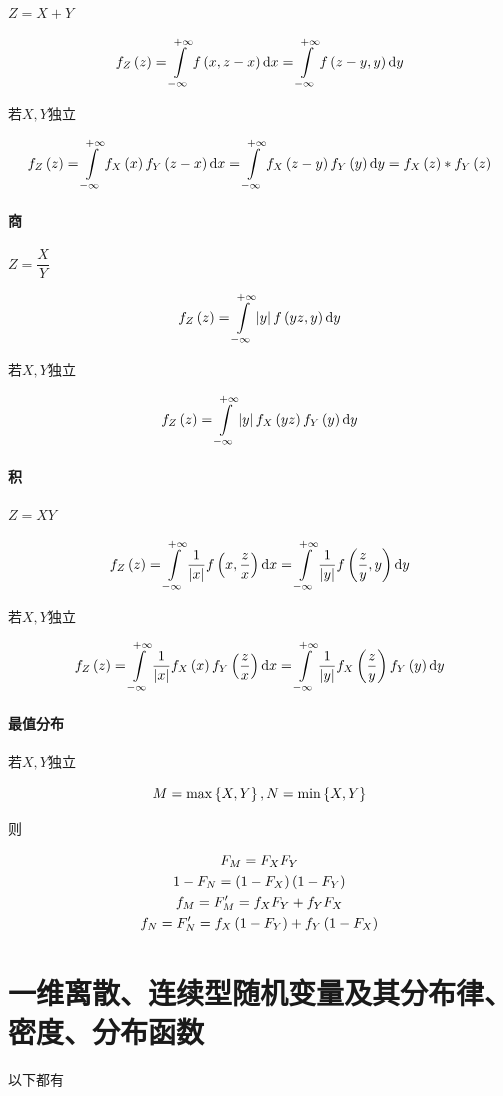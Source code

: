 \documentclass{article}
\begin{document}
$Z=X+Y$

\[f_Z\p{z}
    =\impint f\p{x,z-x}\d x
    =\impint f\p{z-y,y}\d y\]

若$X,Y$独立

\[f_Z\p{z}
    =\impint f_X\p{x}f_Y\p{z-x}\d x
    =\impint f_X\p{z-y}f_Y\p{y}\d y
    =f_X\p{z}*f_Y\p{z}\]

\paragraph{商}

$Z=\dfrac XY$

\[f_Z\p{z}
    =\impint\abs yf\p{yz,y}\d y\]

若$X,Y$独立

\[f_Z\p{z}
    =\impint\abs yf_X\p{yz}f_Y\p{y}\d y\]

\paragraph{积}

$Z=XY$

\[f_Z\p{z}
    =\impint\frac1{\abs x}f\p{x,\frac zx}\d x
    =\impint\frac1{\abs y}f\p{\frac zy,y}\d y\]

若$X,Y$独立

\[f_Z\p{z}
    =\impint\frac1{\abs x}f_X\p{x}f_Y\p{\frac zx}\d x
    =\impint\frac1{\abs y}f_X\p{\frac zy}f_Y\p{y}\d y\]

\paragraph{最值分布}

若$X,Y$独立

\[M=\max\B{X,Y},N=\min\B{X,Y}\]

则

\[\begin{gathered}
        F_M=F_XF_Y\\
        1-F_N=\p{1-F_X}\p{1-F_Y}\\
        f_M=F^\prime_M=f_XF_Y+f_YF_X\\
        f_N=F^\prime_N=f_X\p{1-F_Y}+f_Y\p{1-F_X}
    \end{gathered}\]


\section{一维离散、连续型随机变量及其分布律、密度、分布函数}

以下都有
\end{document}
